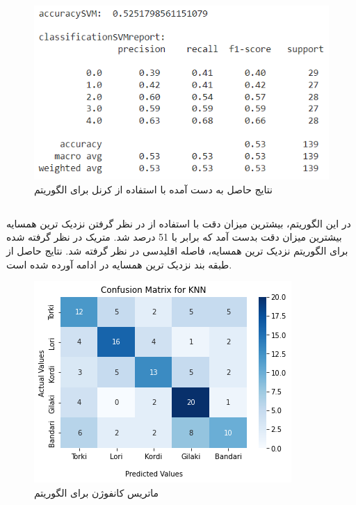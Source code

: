 \begin{figure}[h!]
	\centering
	\includegraphics[width=0.9\linewidth]{images/svm_rbf_scores.PNG}
	\caption{نتایج حاصل به دست آمده با استفاده از کرنل  برای الگوریتم }
	\label{fig:svm_rbf_scores}
\end{figure}

\newpage

\subsection{}
در این الگوریتم، بیشترین میزان دقت با استفاده از در نظر گرفتن نزدیک ترین همسایه بیشترین میزان دقت بدست آمد که برابر با 51 درصد شد. 
متریک در نظر گرفته شده برای الگوریتم نزدیک ترین همسایه، فاصله اقلیدسی در نظر گرفته شد.
نتایج حاصل از طبقه بند نزدیک ترین همسایه در ادامه آورده شده است.

\begin{figure}[h!]
	\centering
	\includegraphics[width=0.75\linewidth]{images/knn_confusion_matrix.png}
	\caption{ماتریس کانفوژن برای الگوریتم }
	\label{fig:knn_confusion_matrix}
\end{figure}

